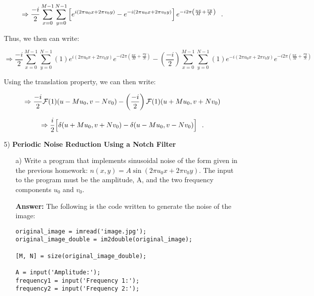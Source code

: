 \documentclass{article}
\begin{document}
\begin{enumerate}
\begin{equation}
\Rightarrow \frac{-i}{2} \sum_{x = 0}^{M-1} \sum_{y = 0}^{N - 1} \left[ e^{i(2\pi u_0 x+2\pi v_0y)} - e^{-i(2\pi u_0 x+2\pi v_0y)} \right] e^{-i2\pi \left( \frac{ux}{M} + \frac{vy}{N} \right)} \hspace{0.1in} .
\end{equation}

Thus, we then can write:

\begin{equation}
\Rightarrow \frac{-i}{2} \sum_{x = 0}^{M-1} \sum_{y = 0}^{N - 1} (1) e^{i(2\pi u_0 x+2\pi v_0y)} e^{-i2\pi \left( \frac{ux}{M} + \frac{vy}{N} \right)} - \left( \frac{-i}{2} \right) \sum_{x = 0}^{M-1} \sum_{y = 0}^{N - 1} (1) e^{-i(2\pi u_0 x+2\pi v_0y)} e^{-i2\pi \left( \frac{ux}{M} + \frac{vy}{N} \right)}
\end{equation}

Using the translation property, we can then write:

\begin{equation}
\Rightarrow \frac{-i}{2} {\cal F}(1) (u - Mu_0, v - Nv_0) - \left( \frac{-i}{2} \right) {\cal F}(1) (u + Mu_0, v + Nv_0)
\end{equation}

\begin{equation}
\Rightarrow \frac{i}{2}\Big[\delta(u+Mu_0,v+Nv_0)-\delta(u-Mu_0,v-Nv_0)\Big] \hspace{0.1in}.
\end{equation}

\item[5)] \textbf{Periodic Noise Reduction Using a Notch Filter}
\begin{enumerate}
\item[a)] Write a program that implements sinusoidal noise of the form given in the previous homework: $n(x,y)=A\sin(2\pi u_0 x+2\pi v_0y)$.  
The input to the program must be the amplitude, A, and the two frequency components $u_0$ and $v_0$.

\textbf{Answer:} The following is the code written to generate the noise of the image:

\begin{lstlisting}
original_image = imread('image.jpg');
original_image_double = im2double(original_image);

[M, N] = size(original_image_double);

A = input('Amplitude:');
frequency1 = input('Frequency 1:');
frequency2 = input('Frequency 2:');


\end{lstlisting}
\end{enumerate}
\end{enumerate}
\end{document}
